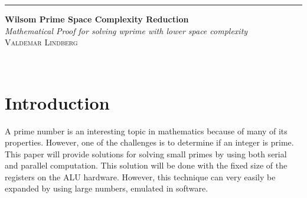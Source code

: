 \documentclass[12pt, oneside, onecolumn]{article}
\begin{document}
\begin{titlepage} %
	
	\raggedleft %
	
	\rule{1pt}{\textheight} %
	\hspace{0.05\textwidth} %
	\parbox[b]{0.75\textwidth}{ %
		
		{\Huge\bfseries Wilsom Prime Space Complexity Reduction}\\[2\baselineskip] %
		{\large\textit{Mathematical Proof for solving wprime with lower space complexity}}\\[4\baselineskip] %
		{\Large\textsc{Valdemar Lindberg}} %
		
		\vspace{0.5\textheight} %
		
		{\noindent }\\[\baselineskip] %
	}

\end{titlepage}

\newpage
{} %

\tableofcontents
\newpage
{} %

% 
\section{Introduction}
A prime number is an interesting topic in mathematics because of many of its properties. However, one of the challenges is to determine if an integer is prime. This paper will provide solutions for solving small primes by using both serial and parallel computation. This solution will be done with the fixed size of the registers on the ALU hardware. However, this technique can very easily be expanded by using large numbers, emulated in software.
\end{document}
